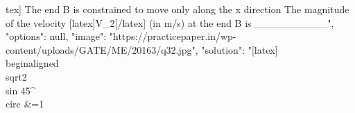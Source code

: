 {tex]  The end B is constrained to move only along the x direction The magnitude of the velocity [latex]V_{2}[/latex]  (in m/s) at the end B is __________",
    "options": null,
    "image": "https://practicepaper.in/wp-content/uploads/GATE/ME/20163/q32.jpg",
    "solution": "[latex] \\begin{aligned} \\sqrt{2} \\sin 45^{\\circ} &=1 \\}
